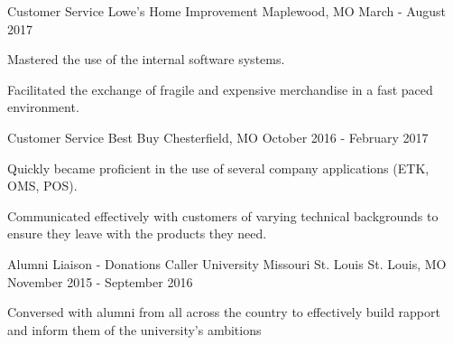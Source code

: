 

\begin{cventries}

  \cventry
    {Customer Service} %
    {Lowe's Home Improvement} %
    {Maplewood, MO} %
    {March - August 2017} %
    {
      \begin{cvitems} %
        \item {Mastered the use of the internal software systems.}
        \item {Facilitated the exchange of fragile and expensive merchandise in a fast paced environment.}
      \end{cvitems}
    }

  \cventry
    {Customer Service} %
    {Best Buy} %
    {Chesterfield, MO} %
    {October 2016 - February 2017} %
    {
      \begin{cvitems} %
        \item {Quickly became proficient in the use of several company applications (ETK, OMS, POS).}
        \item {Communicated effectively with customers of varying technical backgrounds to ensure they leave with the products they need.}
      \end{cvitems}
    }

  \cventry
    {Alumni Liaison - Donations Caller} %
    {University Missouri St. Louis} %
    {St. Louis, MO} %
    {November 2015 - September 2016} %
    {
      \begin{cvitems} %
        \item {Conversed with alumni from all across the country to effectively build rapport and inform them of the university's ambitions}
      \end{cvitems}
    }

\end{cventries}
